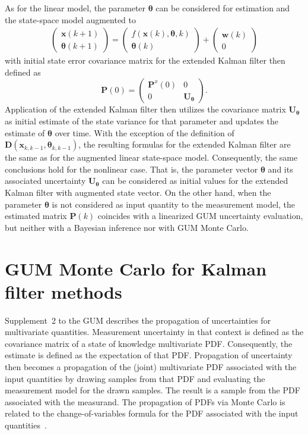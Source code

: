 \documentclass[10pt]{article}
\begin{document}
\begin{spacing}{1}
As for the linear model, the parameter $\bm{\theta}$ can be considered for estimation and the state-space model augmented to 
\begin{align}
	\left( \begin{array}{c}
\bm{x}(k+1) \\ \bm{\theta}(k+1)
\end{array}\right)
=
\left( \begin{array}{c}
f(\bm{x}(k),\bm{\theta},k) \\ \bm{\theta}(k)
\end{array}\right)
+
\left( \begin{array}{c}
\bm{w}(k) \\ 0
\end{array}\right)
\end{align}
with initial state error covariance matrix for the extended Kalman filter then defined as
\begin{equation}
	\bm{P}(0) = \left(\begin{array}{cc}
\bm{P}^{x}(0) & 0 \\ 0 & \bm{U_{\bm{\theta}}}
\end{array}\right) .
\end{equation}
Application of the extended Kalman filter then utilizes the covariance matrix $\bm{U_{\bm{\theta}}}$ as initial estimate of the state variance for that parameter and updates the estimate of $\bm{\theta}$ over time.  
With the exception of the definition of $\bm{D}\left( \bm{x}_{k,k-1},\bm{\theta}_{k,k-1} \right)$, the resulting formulas for the extended Kalman filter are the same as for the augmented linear state-space model. Consequently, the same conclusions hold for the nonlinear case. That is, the parameter vector $\bm{\theta}$ and its associated uncertainty $\bm{U}_{\bm{\theta}}$ can be considered as initial values for the extended Kalman filter with augmented state vector. On the other hand, when the parameter $\bm{\theta}$ is not considered as input quantity to the measurement model, the estimated matrix $\bm{P}(k)$ coincides with a linearized GUM uncertainty evaluation, but neither with a Bayesian inference nor with GUM Monte Carlo.

\section{GUM Monte Carlo for Kalman filter methods}
\label{sec:MC}
Supplement~2 to the GUM \cite{GUMS2} describes the propagation of uncertainties for multivariate quantities. Measurement uncertainty in that context is defined as the covariance matrix of a state of knowledge multivariate PDF. Consequently, the estimate is defined as the expectation of that PDF. Propagation of uncertainty then becomes a propagation of the (joint) multivariate PDF associated with the input quantities  by drawing samples from that PDF and evaluating the measurement model for the drawn samples. The result is a sample from the PDF associated with the measurand. The propagation of PDFs via Monte Carlo is related to the change-of-variables formula for the PDF associated with the input quantities~\cite{possolo2007assessment}. 


\end{spacing}
\end{document}

